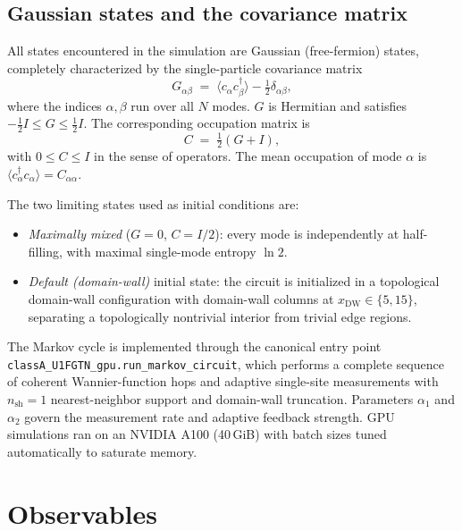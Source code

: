 \documentclass[twocolumn,aps,prx,10pt,floatfix]{revtex4-2}
\begin{document}
\subsection{Gaussian states and the covariance matrix}

All states encountered in the simulation are Gaussian (free-fermion) states,
completely characterized by the single-particle covariance matrix
\begin{equation}
  G_{\alpha\beta} \;=\;
  \langle c_\alpha c_\beta^\dagger \rangle - \tfrac{1}{2}\delta_{\alpha\beta},
  \label{eq:G}
\end{equation}
where the indices $\alpha, \beta$ run over all $N$ modes.
$G$ is Hermitian and satisfies $-\tfrac{1}{2}I \leq G \leq \tfrac{1}{2}I$.
The corresponding occupation matrix is
\begin{equation}
  C \;=\; \tfrac{1}{2}(G + I),
  \label{eq:C}
\end{equation}
with $0 \leq C \leq I$ in the sense of operators.  The mean occupation of mode
$\alpha$ is $\langle c_\alpha^\dagger c_\alpha\rangle = C_{\alpha\alpha}$.

The two limiting states used as initial conditions are:
\begin{itemize}
  \item \emph{Maximally mixed} ($G = 0$, $C = I/2$): every mode is
    independently at half-filling, with maximal single-mode entropy $\ln 2$.
  \item \emph{Default (domain-wall)} initial state: the circuit is initialized
    in a topological domain-wall configuration with domain-wall columns at
    $x_\text{DW} \in \{5, 15\}$, separating a topologically nontrivial interior
    from trivial edge regions.
\end{itemize}

The Markov cycle is implemented through the canonical entry point
\texttt{classA\_U1FGTN\_gpu.run\_markov\_circuit}, which performs a complete
sequence of coherent Wannier-function hops and adaptive single-site measurements
with $n_\text{sh} = 1$ nearest-neighbor support and domain-wall truncation.
Parameters $\alpha_1$ and $\alpha_2$ govern the measurement rate and adaptive
feedback strength.  GPU simulations ran on an NVIDIA A100 (40\,GiB) with batch
sizes tuned automatically to saturate memory.

\section{Observables}
\label{sec:observables}
\end{document}
